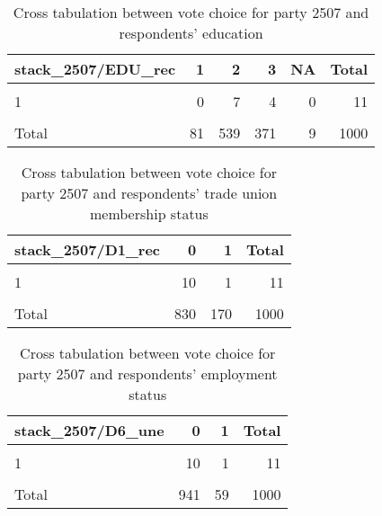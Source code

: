\documentclass[
]{article}
\begin{document}
\begin{table}

\caption{\label{tab:unnamed-chunk-159}Cross tabulation between vote choice for party 2507 and respondents' education 
                   \label{table:crosstab_1_sk}}
\centering
\begin{tabular}[t]{l|r|r|r|r|r}
\hline
stack\_2507/EDU\_rec & 1 & 2 & 3 & NA & Total\\
\hline
\cellcolor{gray!6}{0} & \cellcolor{gray!6}{78} & \cellcolor{gray!6}{521} & \cellcolor{gray!6}{360} & \cellcolor{gray!6}{8} & \cellcolor{gray!6}{967}\\
\hline
1 & 0 & 7 & 4 & 0 & 11\\
\hline
\cellcolor{gray!6}{NA} & \cellcolor{gray!6}{3} & \cellcolor{gray!6}{11} & \cellcolor{gray!6}{7} & \cellcolor{gray!6}{1} & \cellcolor{gray!6}{22}\\
\hline
Total & 81 & 539 & 371 & 9 & 1000\\
\hline
\end{tabular}
\end{table}

\begin{table}

\caption{\label{tab:unnamed-chunk-159}Cross tabulation between vote choice for party 2507 and respondents' trade union membership status
                   \label{table:crosstab_2_sk}}
\centering
\begin{tabular}[t]{l|r|r|r}
\hline
stack\_2507/D1\_rec & 0 & 1 & Total\\
\hline
\cellcolor{gray!6}{0} & \cellcolor{gray!6}{803} & \cellcolor{gray!6}{164} & \cellcolor{gray!6}{967}\\
\hline
1 & 10 & 1 & 11\\
\hline
\cellcolor{gray!6}{NA} & \cellcolor{gray!6}{17} & \cellcolor{gray!6}{5} & \cellcolor{gray!6}{22}\\
\hline
Total & 830 & 170 & 1000\\
\hline
\end{tabular}
\end{table}

\begin{table}

\caption{\label{tab:unnamed-chunk-159}Cross tabulation between vote choice for party 2507 and respondents' employment status 
                   \label{table:crosstab_3_sk}}
\centering
\begin{tabular}[t]{l|r|r|r}
\hline
stack\_2507/D6\_une & 0 & 1 & Total\\
\hline
\cellcolor{gray!6}{0} & \cellcolor{gray!6}{910} & \cellcolor{gray!6}{57} & \cellcolor{gray!6}{967}\\
\hline
1 & 10 & 1 & 11\\
\hline
\cellcolor{gray!6}{NA} & \cellcolor{gray!6}{21} & \cellcolor{gray!6}{1} & \cellcolor{gray!6}{22}\\
\hline
Total & 941 & 59 & 1000\\
\hline
\end{tabular}
\end{table}
\end{document}
